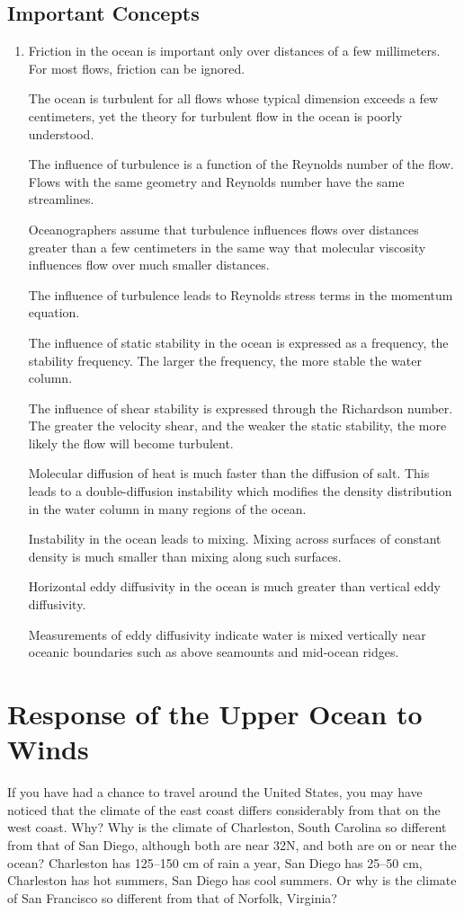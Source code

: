 \section{Important Concepts}
\begin{enumerate}
\item Friction in the ocean is important only over distances of a few
millimeters. For most flows, friction can be ignored.

\vitem The ocean is turbulent for all flows whose typical dimension
exceeds a few centimeters, yet the theory for turbulent flow in the
ocean is poorly understood.

\vitem The influence of turbulence
is a function of the Reynolds number of the flow. Flows with the same
geometry and Reynolds number have the same streamlines.

\vitem Oceanographers assume that turbulence influences flows over
distances greater than a few centimeters in the same way that
molecular viscosity influences flow over much smaller distances.

\vitem The influence of turbulence leads to Reynolds stress terms in
the momentum equation.

\vitem The influence of static stability in the ocean is expressed as
a frequency, the stability frequency. The
larger the frequency, the more stable the water column.

\vitem The influence of shear stability is expressed through the
Richardson number. The greater the velocity shear, and the weaker the
static stability, the more likely the flow will become turbulent.

\vitem Molecular diffusion of heat is much faster than the diffusion
of salt.  This leads to a double-diffusion instability which modifies
the density distribution in the water column in many regions of the
ocean.

\vitem Instability in the ocean leads to mixing. Mixing across
surfaces of constant density is much smaller than mixing along such
surfaces.

\vitem Horizontal eddy diffusivity in the ocean is much greater than
vertical eddy diffusivity.

\vitem Measurements of eddy diffusivity indicate water is mixed
vertically near oceanic boundaries such as above seamounts and
mid-ocean ridges.
\end{enumerate}


\chapter{Response of the Upper Ocean to Winds}
If you have had a chance to travel around the United States, you may
have noticed that the climate of the east coast differs considerably
from that on the west coast. Why? Why is the climate of Charleston,
South Carolina so different from that of San Diego, although both are
near 32\degrees N, and both are on or near the ocean? Charleston has
125--150 cm of rain a year, San Diego has 25--50 cm, Charleston has
hot summers, San Diego has cool summers. Or why is the climate of San
Francisco so different from that of Norfolk, Virginia?

